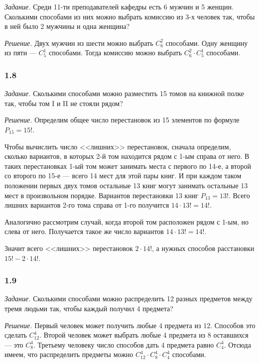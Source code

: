 \documentclass{book}
\begin{document}
\textit{Задание.} Среди 11-ти преподавателей кафедры есть 6 мужчин и 5 женщин.
Сколькими способами из них можно выбрать комиссию из 3-х человек так, чтобы в ней было 2 мужчины и одна женщина?

\textit{Решение.} Двух мужчин из шести можно выбрать $C_6^2$ способами. 
Одну женщину из пяти --- $C_5^1$ способами.
Тогда комиссию можно выбрать $C_6^2\cdot C_5^1$ способами.

\subsubsection*{1.8}

\textit{Задание.} Сколькими способами можно разместить 15 томов на книжной полке так, чтобы том I и II не стояли рядом?

\textit{Решение.} Определим общее число перестановок из 15 элементов по формуле $P_{15}=15!$.

Чтобы вычислить число <<лишних>> перестановок, сначала определим, сколько вариантов, в которых 2-й том находится рядом с 1-ым справа от него.
В таких перестановках 1-ый том может занимать места с первого по 14-е, а второй со второго по 15-е --- всего 14 мест для этой пары книг.
И при каждом таком положении первых двух томов остальные 13 книг могут занимать остальные 13 мест в произвольном порядке.
Вариантов перестановки 13 книг $P_{13}=13!$.
Всего лишних вариантов 2-го тома справа от 1-го получится $14\cdot 13!=14!$.

Аналогично рассмотрим случай, когда второй том расположен рядом с 1-ым, но слева от него.
Получается такое же число вариантов $14\cdot 13!=14!$.

Значит всего <<лишних>> перестановок $2\cdot 14!$, а нужных способов расстановки $15!-2\cdot 14!$.

\subsubsection*{1.9}

\textit{Задание.} Сколькими способами можно распределить 12 разных предметов между тремя людьми так, чтобы каждый получил 4 предмета?

\textit{Решение.} Первый человек может получить любые 4 предмета из 12.
Способов это сделать $C_{12}^4$.
Второй человек может выбрать любые 4 предмета из 8 оставшихся --- это $C_8^4$.
Третьему человеку число способов дать 4 предмета равно $C_4^4$.
Отсюда имеем, что распределить предметы можно $C_{12}^4\cdot C_8^4\cdot C_4^4$ способами.
\end{document}
